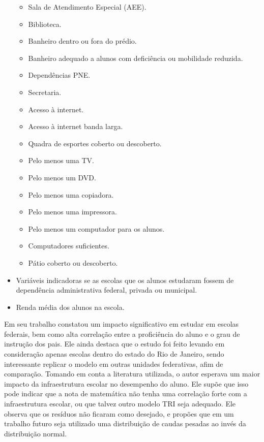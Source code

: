 \begin{itemize}
\begin{itemize}
\item Sala de Atendimento Especial (AEE).
\item Biblioteca.
\item Banheiro dentro ou fora do prédio.
\item Banheiro adequado a alunos com deficiência ou mobilidade reduzida.
\item Dependências PNE.
\item Secretaria.
\item Acesso à internet.
\item Acesso à internet banda larga.
\item Quadra de esportes coberto ou descoberto.
\item Pelo menos uma TV.
\item Pelo menos um DVD.
\item Pelo menos uma copiadora.
\item Pelo menos uma impressora.
\item Pelo menos um computador para os alunos.
\item Computadores suficientes.
\item Pátio coberto ou descoberto.
\end{itemize}
\item Variáveis indicadoras se as escolas que os alunos estudaram fossem de dependência administrativa federal, privada ou municipal.
\item Renda média dos alunos na escola.
\end{itemize}
Em seu trabalho  constatou um impacto significativo em estudar em escolas federais, bem como alta correlação entre a proficiência do aluno e o grau de instrução dos pais. Ele ainda destaca que o estudo foi feito levando em consideração apenas escolas dentro do estado do Rio de Janeiro, sendo interessante replicar o modelo em outras unidades federativas, afim de comparação.
Tomando em conta a literatura utilizada, o autor esperava um maior impacto da infraestrutura escolar no desempenho do aluno. Ele supõe que isso pode indicar que a nota de matemática não tenha uma correlação forte com a infraestrutura  escolar, ou que talvez outro modelo TRI seja adequado. Ele observa que os resíduos não ficaram como desejado, e propões que em um trabalho futuro seja utilizado uma distribuição de caudas pesadas ao invés da distribuição normal.
